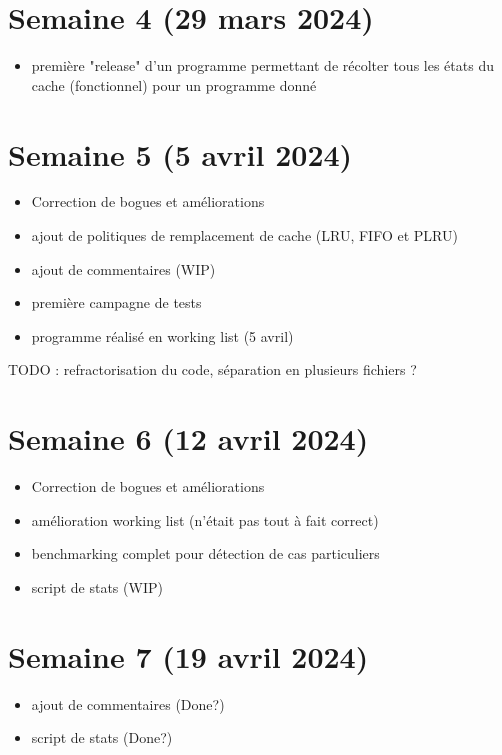 \documentclass[a4paper,12pt]{article}
\begin{document}
\section{Semaine 4 (29 mars 2024)}

\begin{itemize}
  \item première "release" d'un programme permettant de récolter tous les états du cache (fonctionnel) pour un programme donné
\end{itemize}

\section{Semaine 5 (5 avril 2024)}

\begin{itemize}
  \item Correction de bogues et améliorations
  \item ajout de politiques de remplacement de cache (LRU, FIFO et PLRU)
  \item ajout de commentaires (WIP)
  \item première campagne de tests
  \item programme réalisé en working list (5 avril)
\end{itemize}


TODO : refractorisation du code, séparation en plusieurs fichiers ?

\section{Semaine 6 (12 avril 2024)}

\begin{itemize}
  \item Correction de bogues et améliorations
  \item amélioration working list (n'était pas tout à fait correct)
  \item benchmarking complet pour détection de cas particuliers
  \item script de stats (WIP)
\end{itemize}


\section{Semaine 7 (19 avril 2024)}

\begin{itemize}
  \item ajout de commentaires (Done?)
  \item script de stats (Done?)
\end{itemize}
\end{document}
